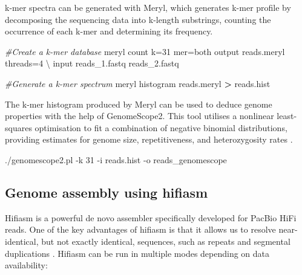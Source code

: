 \documentclass[
]{book}
\newenvironment{Shaded}{\begin{snugshade}}{\end{snugshade}}
\newcommand{\AttributeTok}[1]{\textcolor[rgb]{0.77,0.63,0.00}{#1}}
\newcommand{\CommentTok}[1]{\textcolor[rgb]{0.56,0.35,0.01}{\textit{#1}}}
\newcommand{\DataTypeTok}[1]{\textcolor[rgb]{0.13,0.29,0.53}{#1}}
\newcommand{\ExtensionTok}[1]{#1}
\newcommand{\NormalTok}[1]{#1}
\newcommand{\OperatorTok}[1]{\textcolor[rgb]{0.81,0.36,0.00}{\textbf{#1}}}
\begin{document}
k-mer spectra can be generated with Meryl, which generates k-mer profile by decomposing the sequencing data into k-length substrings, counting the occurrence of each k-mer and determining its frequency.

\small

\begin{Shaded}
\begin{Highlighting}[]
\CommentTok{\#Create a k{-}mer database}
\ExtensionTok{meryl}\NormalTok{ count k=31 mer=both output reads.meryl threads=4 }\DataTypeTok{\textbackslash{}}
\NormalTok{     input reads\_1.fastq reads\_2.fastq}

\CommentTok{\#Generate a k{-}mer spectrum}
\ExtensionTok{meryl}\NormalTok{ histogram reads.meryl }\OperatorTok{\textgreater{}}\NormalTok{ reads.hist}
\end{Highlighting}
\end{Shaded}

\normalsize

The k-mer histogram produced by Meryl can be used to deduce genome properties with the help of GenomeScope2. This tool utilises a nonlinear least-squares optimisation to fit a combination of negative binomial distributions, providing estimates for genome size, repetitiveness, and heterozygosity rates \citep{Ranallo-Benavidez2020-am}.

\small

\begin{Shaded}
\begin{Highlighting}[]
\ExtensionTok{./genomescope2.pl} \AttributeTok{{-}k}\NormalTok{ 31 }\AttributeTok{{-}i}\NormalTok{ reads.hist }\AttributeTok{{-}o}\NormalTok{ reads\_genomescope}
\end{Highlighting}
\end{Shaded}

\normalsize

\hypertarget{host-genome-assembly-hifiasm}{%
\subsection{Genome assembly using hifiasm}\label{host-genome-assembly-hifiasm}}

Hifiasm is a powerful de novo assembler specifically developed for PacBio HiFi reads. One of the key advantages of hifiasm is that it allows us to resolve near-identical, but not exactly identical, sequences, such as repeats and segmental duplications \citep{Cheng2021-nh}. Hifiasm can be run in multiple modes depending on data availability:
\end{document}
